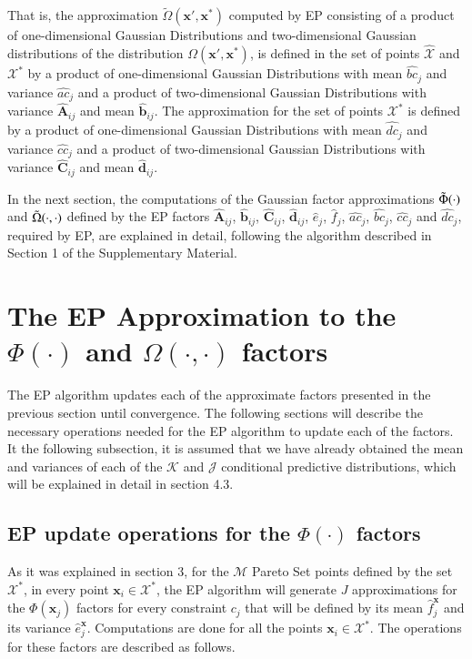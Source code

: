 \documentclass[review,preprint,12pt]{elsarticle}
\begin{document}
That is, the approximation $\tilde{\Omega}(\boldsymbol{x}',\boldsymbol{x}^*)$ computed by EP consisting of a product of one-dimensional Gaussian Distributions and two-dimensional Gaussian distributions of the distribution $\Omega(\boldsymbol{x}',\boldsymbol{x}^*)$, is defined in the set of points $\hat{\mathcal{X}}$ and $\mathcal{X}^*$ by a product of one-dimensional Gaussian Distributions with mean $\hat{bc}_j$ and variance $\hat{ac}_j$ and a product of two-dimensional Gaussian Distributions with variance $\hat{\boldsymbol{A}}_{ij}$ and mean $\hat{\boldsymbol{b}}_{ij}$. The approximation for the set of points $\mathcal{X}^*$ is defined by a product of one-dimensional Gaussian Distributions with mean $\hat{dc}_j$ and variance $\hat{cc}_j$ and a product of two-dimensional Gaussian Distributions with variance $\hat{\boldsymbol{C}}_{ij}$ and mean $\hat{\boldsymbol{d}}_{ij}$.

In the next section, the computations of the Gaussian factor approximations $\Tilde{\Phi}(\cdot)$ and $\Tilde{\Omega}(\cdot,\cdot)$ defined by the EP factors $\hat{\boldsymbol{A}}_{ij}$, $\hat{\boldsymbol{b}}_{ij}$, $\hat{\boldsymbol{C}}_{ij}$, $\hat{\boldsymbol{d}}_{ij}$, $\hat{e}_{j}$, $\hat{f}_{j}$, $\hat{ac}_j$, $\hat{bc}_j$, $\hat{cc}_j$ and $\hat{dc}_j$, required by EP, are explained in detail, following the algorithm described in Section 1 of the Supplementary Material.

\section{The EP Approximation to the $\Phi(\cdot)$ and $\Omega(\cdot,\cdot)$ factors}

The EP algorithm updates each of the approximate factors presented in the previous section until convergence. The following sections will describe the necessary operations needed for the EP algorithm to update each of the factors. It the following subsection, it is assumed that we have already obtained the mean and variances of each of the $\mathcal{K}$ and $\mathcal{J}$ conditional predictive distributions, which will be explained in detail in section 4.3.

\subsection{EP update operations for the $\Phi(\cdot)$ factors}

As it was explained in section 3, for the $\mathcal{M}$ Pareto Set points defined by the set $\mathcal{X}^*$, in every point $\boldsymbol{x}_i \in \mathcal{X}^*$, the EP algorithm will generate $J$ approximations for the $\Phi(\boldsymbol{x}_j)$ factors for every constraint $c_j$ that will be defined by its mean $\hat{f}_{j}^{\boldsymbol{x}}$ and its variance $\hat{e}_{j}^{\boldsymbol{x}}$. Computations are done for all the points $\boldsymbol{x}_i \in \mathcal{X}^*$. The operations for these factors are described as follows.
\end{document}
